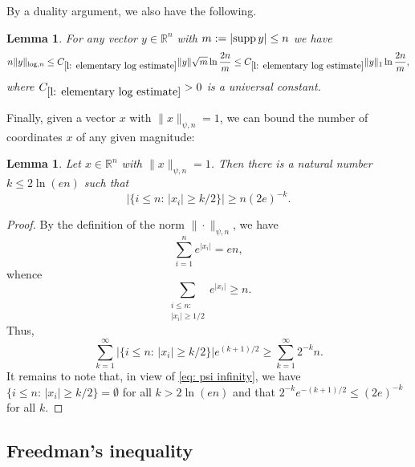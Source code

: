 \documentclass[12pt]{article}
\newtheorem{lemma}[theorem]{Lemma}
\theoremstyle{definition}
\theoremstyle{plain}
\newcommand{\R}{\mathbb{R}}
\newcommand{\supp}{{\rm supp\,}}
\begin{document}
By a duality argument, we also have the following.
\begin{lemma}\label{l: elementary log estimate}
For any vector $y\in\R^n$ with $m:=|\supp y|\leq n$ we have
$$n\|y\|_{\log,n}\leq C_{\ref{l: elementary log estimate}}\|y\|\sqrt{m}\ln\frac{2n}{m}
\leq C_{\ref{l: elementary log estimate}}\|y\|_1\ln\frac{2n}{m},$$
where $C_{\ref{l: elementary log estimate}}>0$ is a universal constant.
\end{lemma}
Finally, given a vector $x$ with $\|x\|_{\psi,n}=1$, we can bound the number of coordinates $x$ of any given magnitude:
\begin{lemma}\label{l: psi lower bound}
Let $x\in\R^n$ with $\|x\|_{\psi,n}=1$. Then there is a natural number $k\leq 2\ln(en)$ such that
$$\big|\big\{i\leq n:\,|x_i|\geq k/2\big\}\big|\geq n (2e)^{-k}.$$
\end{lemma}
\begin{proof}
By the definition of the norm $\|\cdot\|_{\psi,n}$, we have
$$\sum_{i=1}^n e^{|x_i|}=en,$$
whence
$$\sum\limits_{\substack{i\leq n:\\|x_i|\geq 1/2}}e^{|x_i|}\geq n.$$
Thus,
$$\sum_{k=1}^{\infty} \big|\big\{i\leq n:\,|x_i|\geq k/2\big\}\big|e^{(k+1)/2}\geq \sum_{k=1}^\infty 2^{-k}n.$$
It remains to note that, in view of \eqref{eq: psi infinity}, we have $\big\{i\leq n:\,|x_i|\geq k/2\big\}=\emptyset$
for all $k>2\ln(en)$ and that $2^{-k}e^{-(k+1)/2}\leq (2e)^{-k}$ for all $k$.
\end{proof}






\subsection{Freedman's inequality}\label{s: freedman}
\end{document}
